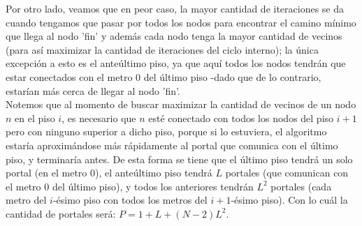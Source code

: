 \documentclass{article}
\theoremstyle{definition}
\theoremstyle{remark}
\begin{document}
Por otro lado, veamos que en peor caso, la mayor cantidad de iteraciones se da cuando tengamos que pasar por todos los nodos para encontrar el camino mínimo que llega al nodo 'fin' y además cada nodo tenga la mayor cantidad de vecinos (para así maximizar la cantidad de iteraciones del ciclo interno); la única excepción a esto es el anteúltimo piso, ya que aquí todos los nodos tendrán que estar conectados con el metro 0 del último piso -dado que de lo contrario, estarían más cerca de llegar al nodo 'fin'.\\

Notemos que al momento de buscar maximizar la cantidad de vecinos de un nodo $n$ en el piso $i$, es necesario que $n$ esté conectado con todos los nodos del piso $i+1$ pero con ninguno superior a dicho piso, porque si lo estuviera, el algoritmo estaría aproximándose más rápidamente al portal que comunica con el último piso, y terminaría antes. De esta forma se tiene que el último piso tendrá un solo portal (en el metro 0), el anteúltimo piso tendrá $L$ portales (que comunican con el metro 0 del último piso), y todos los anteriores tendrán $L^2$ portales (cada metro del $i$-ésimo piso con todos los metros del $i+1$-ésimo piso). Con lo cuál la cantidad de portales será: $P = 1+L+(N-2)L^2$. \\
\end{document}
